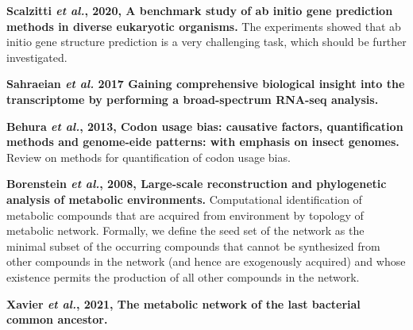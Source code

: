 \documentclass[11pt]{article}
\begin{document}
\begin{sloppypar}
\par
\textbf{Scalzitti \textit{et al.}, 2020, A benchmark study of ab initio gene prediction methods in diverse eukaryotic organisms.} \newline
The experiments showed that ab initio gene structure prediction is a very challenging task, which should be further investigated. 
\par
\textbf{Sahraeian \textit{et al.} 2017 Gaining comprehensive biological insight into the transcriptome by performing a broad-spectrum RNA-seq analysis.} \newline
\par
\textbf{Behura \textit{et al.}, 2013, Codon usage bias: causative factors, quantification methods and genome-eide patterns: with emphasis on insect genomes.} \newline
Review on methods for quantification of codon usage bias.
\par
\textbf{Borenstein \textit{et al.}, 2008, Large-scale reconstruction and phylogenetic analysis of metabolic environments.} \newline
Computational identification of metabolic compounds that are acquired from environment by topology of metabolic network. 
Formally, we define the seed set of the network as the minimal subset of the occurring compounds that cannot be synthesized from other compounds in the network (and hence are exogenously acquired) and whose existence permits the production of all other compounds in the network.
\par
\textbf{Xavier \textit{et al.}, 2021, The metabolic network of the last bacterial common ancestor.} \newline
\par



\end{sloppypar}
\end{document}
